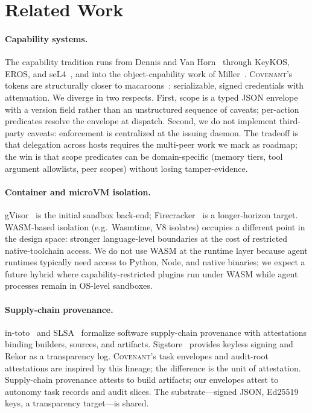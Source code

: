 \documentclass[11pt]{article}
\theoremstyle{plainsmall}
\begin{document}
\section{Related Work}
\label{sec:related}

\paragraph{Capability systems.} The capability tradition runs from Dennis and Van Horn~\cite{dennis1966} through KeyKOS, EROS, and seL4~\cite{sel4}, and into the object-capability work of Miller~\cite{miller2006}. \textsc{Covenant}'s tokens are structurally closer to macaroons~\cite{macaroons}: serializable, signed credentials with attenuation. We diverge in two respects. First, scope is a typed JSON envelope with a version field rather than an unstructured sequence of caveats; per-action predicates resolve the envelope at dispatch. Second, we do not implement third-party caveats: enforcement is centralized at the issuing daemon. The tradeoff is that delegation across hosts requires the multi-peer work we mark as roadmap; the win is that scope predicates can be domain-specific (memory tiers, tool argument allowlists, peer scopes) without losing tamper-evidence.

\paragraph{Container and microVM isolation.} gVisor~\cite{gvisor} is the initial sandbox back-end; Firecracker~\cite{firecracker} is a longer-horizon target. WASM-based isolation (e.g.\ Wasmtime, V8 isolates) occupies a different point in the design space: stronger language-level boundaries at the cost of restricted native-toolchain access. We do not use WASM at the runtime layer because agent runtimes typically need access to Python, Node, and native binaries; we expect a future hybrid where capability-restricted plugins run under WASM while agent processes remain in OS-level sandboxes.

\paragraph{Supply-chain provenance.} in-toto~\cite{intoto} and SLSA~\cite{slsa} formalize software supply-chain provenance with attestations binding builders, sources, and artifacts. Sigstore~\cite{sigstore} provides keyless signing and Rekor as a transparency log. \textsc{Covenant}'s task envelopes and audit-root attestations are inspired by this lineage; the difference is the unit of attestation. Supply-chain provenance attests to build artifacts; our envelopes attest to autonomy task records and audit slices. The substrate---signed JSON, Ed25519 keys, a transparency target---is shared.
\end{document}

